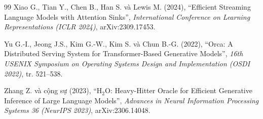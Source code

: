 \begin{thebibliography}{99}
Xiao G., Tian Y., Chen B., Han S. và Lewis M. (2024),
``Efficient Streaming Language Models with Attention Sinks'',
\textit{International Conference on Learning Representations (ICLR 2024)}, arXiv:2309.17453.

Yu G.-I., Jeong J.S., Kim G.-W., Kim S. và Chun B.-G. (2022),
``Orca: A Distributed Serving System for Transformer-Based Generative Models'',
\textit{16th USENIX Symposium on Operating Systems Design and Implementation (OSDI 2022)},
tr. 521--538.

Zhang Z. và cộng sự (2023),
``H$_2$O: Heavy-Hitter Oracle for Efficient Generative Inference of Large Language Models'',
\textit{Advances in Neural Information Processing Systems 36 (NeurIPS 2023)}, arXiv:2306.14048.

\end{thebibliography}
